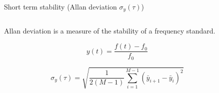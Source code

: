 \begin{frame}{Short term stability (Allan deviation $\sigma_y(\tau)$)}

    \begin{columns}[c, onlytextwidth]

        \begin{column}{0.5\textwidth}

            Allan deviation is a measure of the stability of a frequency standard.

            \begin{equation}
                y(t) = \frac{f(t) - f_0}{f_0}
            \end{equation}

            \begin{equation}
                \sigma_y(\tau) = \sqrt{\frac{1}{2(M-1)} \sum_{i=1}^{M-1} (\bar{y}_{i+1} - \bar{y}_{i})^2}
            \end{equation}

        \end{column}

        \hfill

        \begin{column}{0.45\textwidth}


\end{column}
\end{columns}
\end{frame}
